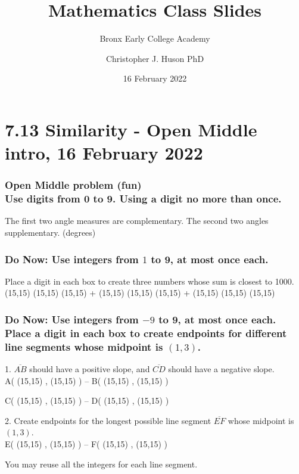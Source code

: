 \documentclass{beamer}
\title{Mathematics Class Slides}
\subtitle{Bronx Early College Academy}
\author{Christopher J. Huson PhD}
\date{16 February 2022}
\begin{document}
\frame{\titlepage}
\section[Outline]{}
\frame{\tableofcontents}

\section{7.13 Similarity - Open Middle intro, 16 February 2022}


\frame
{
  \frametitle{Open Middle problem (fun) \\
  Use digits from 0 to 9. Using a digit no more than once.}
    The first two angle measures are complementary. The second two angles supplementary. (degrees)\\[0.75cm]
       \vspace{5cm} 
}

\frame
{
  \frametitle{Do Now:
  Use integers from $1$ to 9, at most once each.}
  Place a digit in each box to create three numbers whose sum is closest to 1000.\\[0.75cm]

 \framebox(15,15){} \framebox(15,15){} \framebox(15,15){} \Large{+}
 \framebox(15,15){} \framebox(15,15){} \framebox(15,15){} \Large{+}
 \framebox(15,15){} \framebox(15,15){} \framebox(15,15){}
}

\frame
{
  \frametitle{Do Now:
  Use integers from $-9$ to 9, at most once each.
  Place a digit in each box to create endpoints for different line segments whose midpoint is $(1, 3)$.}
  
  1. $\overline{AB}$ should have a positive slope, and $\overline{CD}$ should have a negative slope. \\[0.25cm]

  \Large{A(} \framebox(15,15){} , \framebox(15,15){} \Large{)} -- 
  \Large{B(} \framebox(15,15){} , \framebox(15,15){} \Large{)} 

  \Large{C(} \framebox(15,15){} , \framebox(15,15){} \Large{)} -- 
  \Large{D(} \framebox(15,15){} , \framebox(15,15){} \Large{)} \vspace{0.25cm}

  2. Create endpoints for the longest possible line segment $\overline{EF}$ whose midpoint is $(1, 3)$.\\[0.25cm]

  \Large{E(} \framebox(15,15){} , \framebox(15,15){} \Large{)} -- 
  \Large{F(} \framebox(15,15){} , \framebox(15,15){} \Large{)}

  You may reuse all the integers for each line segment.
}
\end{document}

